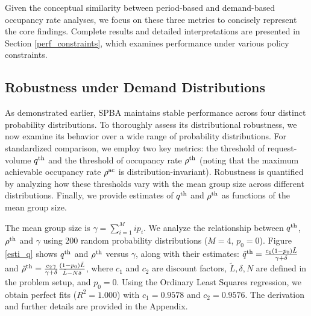 Given the conceptual similarity between period-based and demand-based occupancy rate analyses, we focus on these three metrics to concisely represent the core findings. Complete results and detailed interpretations are presented in Section \ref{perf_constraints}, which examines performance under various policy constraints.


\subsection{Robustness under Demand Distributions}
As demonstrated earlier, SPBA maintains stable performance across four distinct probability distributions. To thoroughly assess its distributional robustness, we now examine its behavior over a wide range of probability distributions. For standardized comparison, we employ two key metrics: the threshold of request-volume $q^{\textup{th}}$ and the threshold of occupancy rate $\rho^{\textup{th}}$ (noting that the maximum achievable occupancy rate $\rho^{\textup{ac}}$ is distribution-invariant).
Robustness is quantified by analyzing how these thresholds vary with the mean group size across different distributions. Finally, we provide estimates of $q^{\textup{th}}$ and $\rho^{\textup{th}}$ as functions of the mean group size.


The mean group size is $\gamma = \sum_{i=1}^{M} i p_i$. We analyze the relationship between $q^{\textup{th}}$, $\rho^{\textup{th}}$ and $\gamma$ using 200 random probability distributions ($M=4$, $p_0=0$).
Figure \ref{esti_q} shows $q^{\textup{th}}$ and $\rho^{\textup{th}}$ versus $\gamma$, along with their estimates: 
$\tilde{q}^{\textup{th}} =  \frac{c_1 (1-p_0) \tilde{L}}{\gamma + \delta}$ and $\tilde{\rho}^{\textup{th}} = \frac{c_2 \gamma}{\gamma +\delta} \frac{(1-p_0) \tilde{L}}{\tilde{L}-N \delta}$, where 
$c_1$ and $c_2$ are discount factors, $\tilde{L}, \delta, N$ are defined in the problem setup, and $p_0 =0$. Using the Ordinary Least Squares regression, we obtain perfect fits ($R^{2} = 1.000$) with $c_1 = 0.9578$ and $c_2 = 0.9576$. The derivation and further details are provided in the Appendix.


